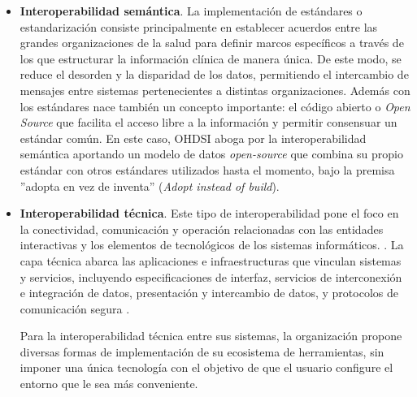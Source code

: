 \begin{itemize}

    \item \textbf{Interoperabilidad semántica}. La implementación de estándares o estandarización consiste principalmente en establecer acuerdos entre las grandes organizaciones de la salud para definir marcos específicos a través de los que estructurar la información clínica de manera única. De este modo, se reduce el desorden y la disparidad de los datos, permitiendo el intercambio de mensajes entre sistemas pertenecientes a distintas organizaciones. 
    Además con los estándares nace también un concepto importante: el código abierto o \textit{Open Source} que facilita el acceso libre a la información y permitir consensuar un estándar común.
   En este caso, OHDSI aboga por la interoperabilidad semántica aportando un modelo de datos \textit{open-source} que combina su propio estándar con otros estándares utilizados hasta el momento, bajo la premisa ''adopta en vez de inventa'' (\textit{Adopt instead of build}).

    \item \textbf{Interoperabilidad técnica}. Este tipo de interoperabilidad pone el foco en la conectividad, comunicación y operación relacionadas con las entidades interactivas y los elementos de tecnológicos de los sistemas informáticos. \parencite{santos2021interoperability}. La capa técnica abarca las aplicaciones e infraestructuras que vinculan sistemas y servicios, incluyendo especificaciones de interfaz, servicios de interconexión e integración de datos, presentación y intercambio de datos, y protocolos de comunicación segura \parencite{leal2019interoperability}.

    Para la interoperabilidad técnica entre sus sistemas, la organización propone diversas formas de implementación de su ecosistema de herramientas, sin imponer una única tecnología con el objetivo de que el usuario configure el entorno que le sea más conveniente.
    

\end{itemize}
